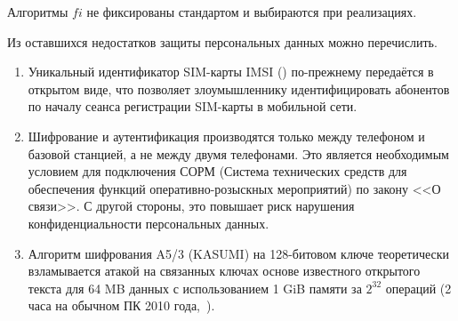 Алгоритмы $fi$ не фиксированы стандартом и выбираются при реализациях.

Из оставшихся недостатков защиты персональных данных можно перечислить.
\begin{enumerate}
    \item Уникальный идентификатор SIM-карты IMSI () по-прежнему передаётся в открытом виде, что позволяет злоумышленнику идентифицировать абонентов по началу сеанса регистрации SIM-карты в мобильной сети.
    \item Шифрование и аутентификация производятся только между телефоном и базовой станцией, а не между двумя телефонами. Это является необходимым условием для подключения СОРМ (Система технических средств для обеспечения функций оперативно-розыскных мероприятий) по закону <<О связи>>. С другой стороны, это повышает риск нарушения конфиденциальности персональных данных.
    \item Алгоритм шифрования A5/3 (KASUMI) на 128-би\-то\-вом ключе теоретически взламывается атакой на связанных ключах основе известного открытого текста для 64 MB данных с использованием 1 GiB памяти за $2^{32}$ операций (2 часа на обычном ПК 2010 года,~\cite{Dunkelman:Keller:Shamir:2010}).
\end{enumerate}
